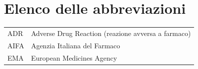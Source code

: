 \chapter*{Elenco delle abbreviazioni}

\begin{longtable}{@{}p{3cm}p{\dimexpr\linewidth-3cm\relax}@{}}
  ADR   & Adverse Drug Reaction (reazione avversa a farmaco) \\
  AIFA  & Agenzia Italiana del Farmaco \\
  EMA   & European Medicines Agency \\
\end{longtable}
